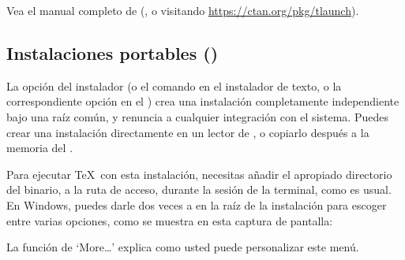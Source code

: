 \documentclass{article}
\begin{document}
Vea el manual completo de  (, o visitando \url{https://ctan.org/pkg/tlaunch}).

\subsection{Instalaciones portables (\USB{})}
\label{sec:portable-tl}

La opción  del instalador (o el comando
 en el instalador de texto, o la correspondiente
opción en el \GUI{}) crea una instalación completamente
independiente bajo una raíz común, y renuncia a cualquier
integración con el sistema. Puedes crear una instalación
directamente en un lector de \USB{}, o copiarlo después a la
memoria del \USB{}.

Para ejecutar \TeX\ con esta instalación, necesitas añadir el
apropiado directorio del binario, a la ruta de acceso, durante la sesión
de la terminal, como es usual. En Windows, puedes darle dos veces a 
 en la raíz de la instalación para escoger
entre varias opciones, como se muestra en esta captura de pantalla:

\medskip
{}
\smallskip

\noindent La función de `More\ldots' explica como usted puede
personalizar este menú. 
\end{document}
